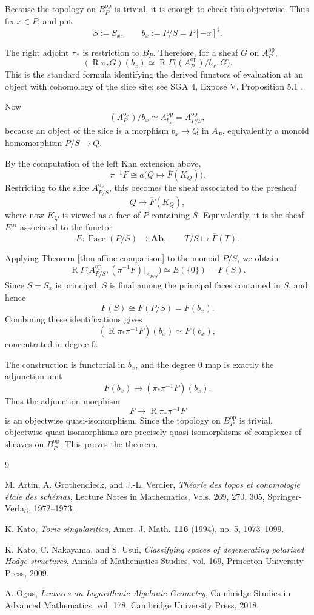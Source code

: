 \documentclass[11pt]{article}
\DeclareMathOperator{\Face}{Face}
\DeclareMathOperator{\R}{R}
\begin{document}
Because the topology on \(B_P^{\mathrm{op}}\) is trivial, it is enough to check this objectwise.  Thus fix \(x\in P\), and put
\[
S:=S_x,\qquad b_x:=P/S=P[-x]^\sharp.
\]

The right adjoint \(\pi_*\) is restriction to \(B_P\).  Therefore, for a sheaf \(G\) on \(A_P^{\mathrm{op}}\),
\[
(\R\pi_*G)(b_x)
\simeq
\R\Gamma\bigl((A_P^{\mathrm{op}})/b_x,G\bigr).
\]
This is the standard formula identifying the derived functors of evaluation at an object with cohomology of the slice site; see SGA \(4\), Exposé V, Proposition 5.1 \cite{SGA4}.

Now
\[
(A_P^{\mathrm{op}})/b_x \simeq A_{b_x}^{\mathrm{op}}=A_{P/S}^{\mathrm{op}},
\]
because an object of the slice is a morphism \(b_x\to Q\) in \(A_P\), equivalently a monoid homomorphism \(P/S\to Q\).

By the computation of the left Kan extension above,
\[
\pi^{-1}F
\cong
a\bigl(Q\mapsto \overline F(K_Q)\bigr).
\]
Restricting to the slice \(A_{P/S}^{\mathrm{op}}\), this becomes the sheaf associated to the presheaf
\[
Q\longmapsto \overline F(K_Q),
\]
where now \(K_Q\) is viewed as a face of \(P\) containing \(S\).  Equivalently, it is the sheaf \(E^{\mathrm{br}}\) associated to the functor
\[
E:\Face(P/S)\longrightarrow \mathbf{Ab},
\qquad
T/S\longmapsto \overline F(T).
\]

Applying Theorem \ref{thm:affine-comparison} to the monoid \(P/S\), we obtain
\[
\R\Gamma\bigl(A_{P/S}^{\mathrm{op}},(\pi^{-1}F)|_{A_{P/S}}\bigr)
\simeq
E(\{0\})
=
\overline F(S).
\]
Since \(S=S_x\) is principal, \(S\) is final among the principal faces contained in \(S\), and hence
\[
\overline F(S)\cong F(P/S)=F(b_x).
\]
Combining these identifications gives
\[
(\R\pi_*\pi^{-1}F)(b_x)\simeq F(b_x),
\]
concentrated in degree \(0\).

The construction is functorial in \(b_x\), and the degree \(0\) map is exactly the adjunction unit
\[
F(b_x)\longrightarrow (\pi_*\pi^{-1}F)(b_x).
\]
Thus the adjunction morphism
\[
F\longrightarrow \R\pi_*\pi^{-1}F
\]
is an objectwise quasi-isomorphism.  Since the topology on \(B_P^{\mathrm{op}}\) is trivial, objectwise quasi-isomorphisms are precisely quasi-isomorphisms of complexes of sheaves on \(B_P^{\mathrm{op}}\).  This proves the theorem.

\begin{thebibliography}{9}

M. Artin, A. Grothendieck, and J.-L. Verdier,
\emph{Théorie des topos et cohomologie étale des schémas},
Lecture Notes in Mathematics, Vols. 269, 270, 305, Springer-Verlag, 1972--1973.

K. Kato,
\emph{Toric singularities},
Amer. J. Math. \textbf{116} (1994), no. 5, 1073--1099.

K. Kato, C. Nakayama, and S. Usui,
\emph{Classifying spaces of degenerating polarized Hodge structures},
Annals of Mathematics Studies, vol. 169, Princeton University Press, 2009.

A. Ogus,
\emph{Lectures on Logarithmic Algebraic Geometry},
Cambridge Studies in Advanced Mathematics, vol. 178, Cambridge University Press, 2018.

\end{thebibliography}
\end{document}
